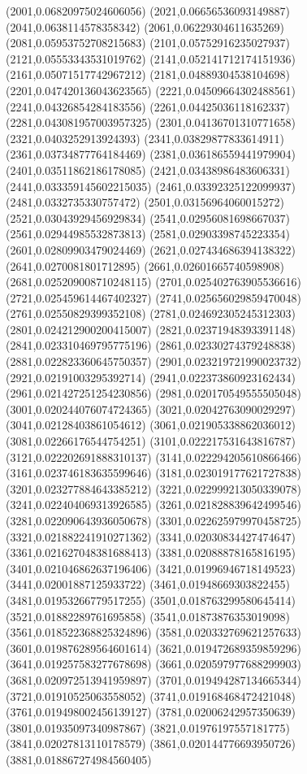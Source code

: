 {(2001,0.06820975024606056)
(2021,0.06656536093149887)
(2041,0.0638114578358342)
(2061,0.06229304611635269)
(2081,0.05953752708215683)
(2101,0.05752916235027937)
(2121,0.05553343531019762)
(2141,0.052141712174151936)
(2161,0.05071517742967212)
(2181,0.04889304538104698)
(2201,0.047420136043623565)
(2221,0.04509664302488561)
(2241,0.04326854284183556)
(2261,0.04425036118162337)
(2281,0.043081957003957325)
(2301,0.04136701310771658)
(2321,0.0403252913924393)
(2341,0.03829877833614911)
(2361,0.03734877764184469)
(2381,0.036186559441979904)
(2401,0.03511862186178085)
(2421,0.03438986483606331)
(2441,0.033359145602215035)
(2461,0.03392325122099937)
(2481,0.0332735330757472)
(2501,0.03156964060015272)
(2521,0.03043929456929834)
(2541,0.02956081698667037)
(2561,0.02944985532873813)
(2581,0.02903398745223354)
(2601,0.02809903479024469)
(2621,0.027434686394138322)
(2641,0.0270081801712895)
(2661,0.02601665740598908)
(2681,0.025209008710248115)
(2701,0.025402763905536616)
(2721,0.025459614467402327)
(2741,0.025656029859470048)
(2761,0.02550829399352108)
(2781,0.024692305245312303)
(2801,0.024212900200415007)
(2821,0.02371948393391148)
(2841,0.023310469795775196)
(2861,0.02330274379248838)
(2881,0.022823360645750357)
(2901,0.023219721990023732)
(2921,0.02191003295392714)
(2941,0.022373860923162434)
(2961,0.021427251254230856)
(2981,0.020170549555505048)
(3001,0.020244076074724365)
(3021,0.02042763090029297)
(3041,0.02128403861054612)
(3061,0.021905338862036012)
(3081,0.02266176544754251)
(3101,0.022217531643816787)
(3121,0.022202691888310137)
(3141,0.022294205610866466)
(3161,0.023746183635599646)
(3181,0.023019177621727838)
(3201,0.023277884643385212)
(3221,0.022999213050339078)
(3241,0.022404069313926585)
(3261,0.021828839642499546)
(3281,0.022090643936050678)
(3301,0.022625979970458725)
(3321,0.021882241910271362)
(3341,0.02030834427474647)
(3361,0.021627048381688413)
(3381,0.02088878165816195)
(3401,0.021046862637196406)
(3421,0.01996946718149523)
(3441,0.02001887125933722)
(3461,0.01948669303822455)
(3481,0.01953266779517255)
(3501,0.018763299580645414)
(3521,0.01882289761695858)
(3541,0.01873876353019098)
(3561,0.018522368825324896)
(3581,0.020332769621257633)
(3601,0.019876289564601614)
(3621,0.019472689359859296)
(3641,0.019257583277678698)
(3661,0.020597977688299903)
(3681,0.020972513941959897)
(3701,0.019494287134665344)
(3721,0.01910525063558052)
(3741,0.019168468472421048)
(3761,0.019498002456139127)
(3781,0.02006242957350639)
(3801,0.01935097340987867)
(3821,0.01976197557181775)
(3841,0.02027813110178579)
(3861,0.020144776693950726)
(3881,0.018867274984560405)
}
